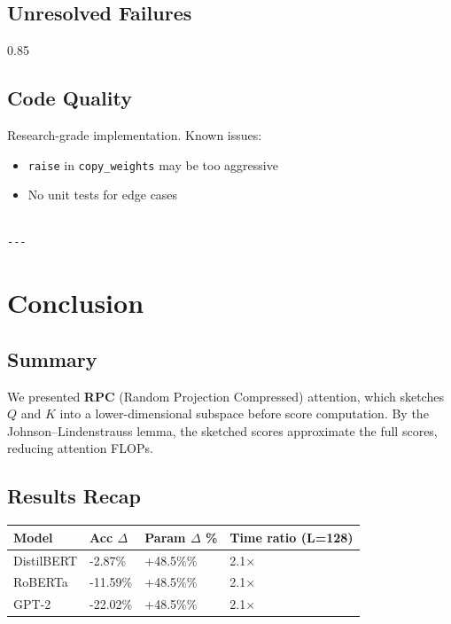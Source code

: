 \subsection{Unresolved Failures}

0.85

\subsection{Code Quality}

Research-grade implementation. Known issues:
\begin{itemize}
\item \texttt{raise} in \texttt{copy\_weights} may be too aggressive
\item No unit tests for edge cases
\end{itemize}
\begin{lstlisting}

---
\end{lstlisting}


\section{Conclusion}

\subsection{Summary}

We presented \textbf{RPC} (Random Projection Compressed) attention, which sketches 
$Q$ and $K$ into a lower-dimensional subspace before score computation. 
By the Johnson--Lindenstrauss lemma, the sketched scores approximate the 
full scores, reducing attention FLOPs.

\subsection{Results Recap}

\begin{table}[H]
\centering
\small
\begin{tabular}{llll}
\toprule
\textbf{Model} & \textbf{Acc $\Delta$} & \textbf{Param $\Delta$ \%} & \textbf{Time ratio (L=128)} \\
\midrule
DistilBERT & -2.87\% & +48.5\%\% & 2.1$\times$ \\
RoBERTa & -11.59\% & +48.5\%\% & 2.1$\times$ \\
GPT-2 & -22.02\% & +48.5\%\% & 2.1$\times$ \\
\bottomrule
\end{tabular}
\end{table}

